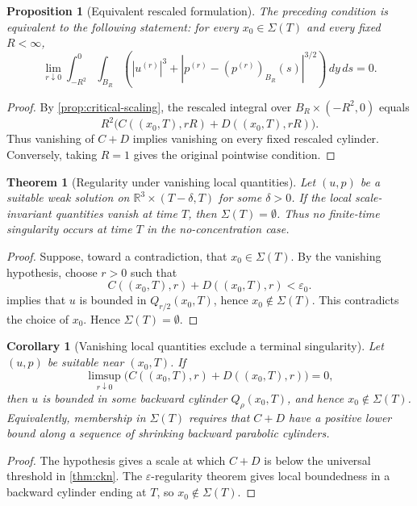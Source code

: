 \documentclass[11pt]{amsart}
\theoremstyle{plain}
\newtheorem{theorem}{Theorem}[section]
\newtheorem{proposition}[proposition]{Proposition}
\newtheorem{corollary}[corollary]{Corollary}
\theoremstyle{definition}
\theoremstyle{remark}
\begin{document}
\begin{proposition}[Equivalent rescaled formulation]
\label{prop:vanishing-rescaled}
The preceding condition is equivalent to the following statement: for every
\(x_0\in\Sigma(T)\) and every fixed \(R<\infty\),
\[
  \lim_{r\downarrow0}
  \int_{-R^2}^{0}\int_{B_R}
  \left(
  |u^{(r)}|^3+
  |p^{(r)}-(p^{(r)})_{B_R}(s)|^{3/2}
  \right)\,dy\,ds=0.
\]
\end{proposition}

\begin{proof}
By \cref{prop:critical-scaling}, the rescaled integral over
\(B_R\times(-R^2,0)\) equals
\[
  R^2\bigl(C((x_0,T),rR)+D((x_0,T),rR)\bigr).
\]
Thus vanishing of \(C+D\) implies vanishing on every fixed rescaled cylinder.
Conversely, taking \(R=1\) gives the original pointwise condition.
\end{proof}

\begin{theorem}[Regularity under vanishing local quantities]\label{thm:no-concentration}
Let \((u,p)\) be a suitable weak solution on
\(\mathbb R^3\times(T-\delta,T)\) for some \(\delta>0\).  If the local
scale-invariant quantities vanish at time \(T\), then
\(\Sigma(T)=\emptyset\).  Thus no finite-time singularity occurs at time \(T\)
in the no-concentration case.
\end{theorem}

\begin{proof}
Suppose, toward a contradiction, that \(x_0\in\Sigma(T)\).  By the vanishing
hypothesis, choose \(r>0\) such that
\[
  C((x_0,T),r)+D((x_0,T),r)<\varepsilon_0.
\]
 implies that \(u\) is bounded in \(Q_{r/2}(x_0,T)\), hence
\(x_0\notin\Sigma(T)\).  This contradicts the choice of \(x_0\).  Hence
\(\Sigma(T)=\emptyset\).
\end{proof}

\begin{corollary}[Vanishing local quantities exclude a terminal singularity]
\label{cor:escape}
Let \((u,p)\) be suitable near \((x_0,T)\).  If
\[
  \limsup_{r\downarrow0}
  \bigl(C((x_0,T),r)+D((x_0,T),r)\bigr)=0,
\]
then \(u\) is bounded in some backward cylinder \(Q_\rho(x_0,T)\), and hence
\(x_0\notin\Sigma(T)\).  Equivalently, membership in \(\Sigma(T)\) requires
that \(C+D\) have a positive lower bound along a sequence of shrinking backward
parabolic cylinders.
\end{corollary}

\begin{proof}
The hypothesis gives a scale at which \(C+D\) is below the universal threshold
in \cref{thm:ckn}.  The \(\varepsilon\)-regularity theorem gives local boundedness in
a backward cylinder ending at \(T\), so \(x_0\notin\Sigma(T)\).
\end{proof}
\end{document}
